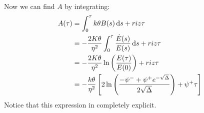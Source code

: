 Now we can find $A$ by integrating:
\begin{align}
    \notag A(\tau) &= \int_0^{\tau} k\theta B(s)\,\dd s + riz\tau \\
    &=
    \notag -\frac{2K\theta}{\eta^2} \int_0^{\tau} \frac{\dot{E}(s)}{E(s)}\,\dd s + riz\tau \\
    &=
    \notag -\frac{2K\theta}{\eta^2}\ln\left(\frac{E(\tau)}{E(0)}\right) + riz\tau \\
    &=
    -\frac{k\theta}{\eta^2}\left[2\ln\left(\frac{-\psi^- + \psi^+ e^{-\sqrt{\Delta}}}{2\sqrt{\Delta}}\right) + \psi^+\tau \right]
\end{align} %
Notice that this expression in completely explicit.
